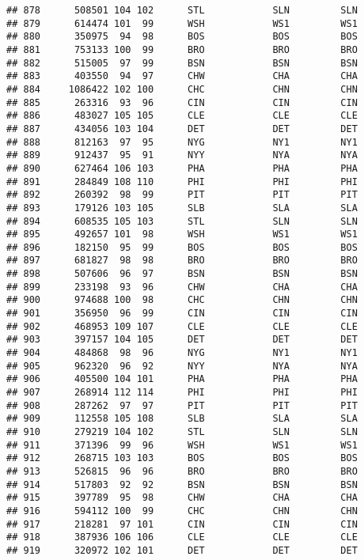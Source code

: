 \documentclass[]{article}
\begin{document}
\begin{verbatim}
## 878      508501 104 102      STL            SLN         SLN
## 879      614474 101  99      WSH            WS1         WS1
## 880      350975  94  98      BOS            BOS         BOS
## 881      753133 100  99      BRO            BRO         BRO
## 882      515005  97  99      BSN            BSN         BSN
## 883      403550  94  97      CHW            CHA         CHA
## 884     1086422 102 100      CHC            CHN         CHN
## 885      263316  93  96      CIN            CIN         CIN
## 886      483027 105 105      CLE            CLE         CLE
## 887      434056 103 104      DET            DET         DET
## 888      812163  97  95      NYG            NY1         NY1
## 889      912437  95  91      NYY            NYA         NYA
## 890      627464 106 103      PHA            PHA         PHA
## 891      284849 108 110      PHI            PHI         PHI
## 892      260392  98  99      PIT            PIT         PIT
## 893      179126 103 105      SLB            SLA         SLA
## 894      608535 105 103      STL            SLN         SLN
## 895      492657 101  98      WSH            WS1         WS1
## 896      182150  95  99      BOS            BOS         BOS
## 897      681827  98  98      BRO            BRO         BRO
## 898      507606  96  97      BSN            BSN         BSN
## 899      233198  93  96      CHW            CHA         CHA
## 900      974688 100  98      CHC            CHN         CHN
## 901      356950  96  99      CIN            CIN         CIN
## 902      468953 109 107      CLE            CLE         CLE
## 903      397157 104 105      DET            DET         DET
## 904      484868  98  96      NYG            NY1         NY1
## 905      962320  96  92      NYY            NYA         NYA
## 906      405500 104 101      PHA            PHA         PHA
## 907      268914 112 114      PHI            PHI         PHI
## 908      287262  97  97      PIT            PIT         PIT
## 909      112558 105 108      SLB            SLA         SLA
## 910      279219 104 102      STL            SLN         SLN
## 911      371396  99  96      WSH            WS1         WS1
## 912      268715 103 103      BOS            BOS         BOS
## 913      526815  96  96      BRO            BRO         BRO
## 914      517803  92  92      BSN            BSN         BSN
## 915      397789  95  98      CHW            CHA         CHA
## 916      594112 100  99      CHC            CHN         CHN
## 917      218281  97 101      CIN            CIN         CIN
## 918      387936 106 106      CLE            CLE         CLE
## 919      320972 102 101      DET            DET         DET

\end{verbatim}
\end{document}
